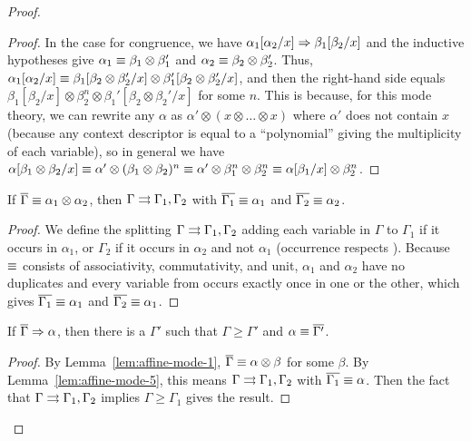 \begin{proof}
\begin{proof}
In the case for congruence, we have
$\alpha_1[\alpha_2/x] \Rightarrow \beta_1[\beta_2/x]$
and the inductive hypotheses give
    $\alpha_1 \equiv \beta_1 \otimes \beta_1'$
and $\alpha_2 \equiv \beta_2 \otimes \beta_2'$.  
Thus, 
$\alpha_1[\alpha_2/x] \equiv \beta_1[\beta_2 \otimes \beta_2'/x] \otimes \beta_1'[\beta_2 \otimes \beta_2'/x]$,
and then the right-hand side equals 
$\beta_1[\beta_2/x] \otimes \beta_2^n \otimes \beta_1'[\beta_2 \otimes \beta_2'/x]$
for some $n$.  
This is because, 
for this mode theory, we can rewrite any $\alpha$ as $\alpha' \otimes (x
\otimes \ldots \otimes x)$ where $\alpha'$ does not contain $x$ (because
any context descriptor is equal to a ``polynomial'' giving the
multiplicity of each variable), so in general we have $\alpha[\beta_1
  \otimes \beta_2/x] \equiv \alpha' \otimes (\beta_1 \otimes \beta_2)^n
\equiv \alpha' \otimes \beta_1^n \otimes \beta_2^n \equiv \alpha[\beta_1/x]
\otimes \beta_2^n$.
\end{proof}

\begin{lemma} \label{lem:affine-mode-5}
If $\overline{\Gamma} \equiv \alpha_1 \otimes \alpha_2$, 
then $\Gamma \rightrightarrows \Gamma_1,\Gamma_2$ with 
$\overline{\Gamma_1} \equiv \alpha_1$ 
and $\overline{\Gamma_2} \equiv \alpha_2$.  
\end{lemma}
\begin{proof}
We define the splitting $\Gamma \rightrightarrows \Gamma_1,\Gamma_2$ adding each
variable in $\Gamma$ to $\Gamma_1$ if it occurs in $\alpha_1$, or
$\Gamma_2$ if it occurs in $\alpha_2$ and not $\alpha_1$ (occurrence
respects \deq).  Because $\equiv$ consists of associativity,
commutativity, and unit, $\alpha_1$ and $\alpha_2$ have no duplicates
and every variable from \vars{\Gamma} occurs exactly once in one or the
other, which gives $\overline{\Gamma_1} \equiv \alpha_1$ and $\overline{\Gamma_2}
\equiv \alpha_1$.
\end{proof}

\begin{lemma} \label{lem:affine-mode-4}
If $\overline{\Gamma} \Rightarrow \alpha$, then there is a $\Gamma'$ such that
$\Gamma \ge \Gamma'$ and $\alpha \equiv \overline{\Gamma'}$.
\end{lemma}

\begin{proof}
By Lemma~\ref{lem:affine-mode-1}, $\overline{\Gamma} \equiv \alpha \otimes
\beta$ for some $\beta$.  By Lemma~\ref{lem:affine-mode-5}, this means
$\Gamma \rightrightarrows \Gamma_1,\Gamma_2$ with $\overline{\Gamma_1} \equiv \alpha$.
Then the fact that $\Gamma \rightrightarrows \Gamma_1,\Gamma_2$ implies $\Gamma
\ge \Gamma_1$ gives the result.
\end{proof}


\end{proof}
